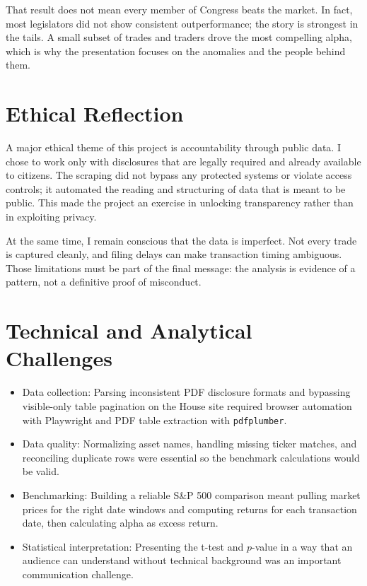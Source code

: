 \documentclass[12pt]{article}
\begin{document}
That result does not mean every member of Congress beats the market. In fact, most legislators did not show consistent outperformance; the story is strongest in the tails. A small subset of trades and traders drove the most compelling alpha, which is why the presentation focuses on the anomalies and the people behind them.

\section*{Ethical Reflection}
A major ethical theme of this project is accountability through public data. I chose to work only with disclosures that are legally required and already available to citizens. The scraping did not bypass any protected systems or violate access controls; it automated the reading and structuring of data that is meant to be public. This made the project an exercise in unlocking transparency rather than in exploiting privacy.

At the same time, I remain conscious that the data is imperfect. Not every trade is captured cleanly, and filing delays can make transaction timing ambiguous. Those limitations must be part of the final message: the analysis is evidence of a pattern, not a definitive proof of misconduct.

\section*{Technical and Analytical Challenges}

\begin{itemize}
  \item Data collection: Parsing inconsistent PDF disclosure formats and bypassing visible-only table pagination on the House site required browser automation with Playwright and PDF table extraction with \texttt{pdfplumber}.
  \item Data quality: Normalizing asset names, handling missing ticker matches, and reconciling duplicate rows were essential so the benchmark calculations would be valid.
  \item Benchmarking: Building a reliable S\&P 500 comparison meant pulling market prices for the right date windows and computing returns for each transaction date, then calculating alpha as excess return.
  \item Statistical interpretation: Presenting the t-test and $p$-value in a way that an audience can understand without technical background was an important communication challenge.
\end{itemize}
\end{document}
